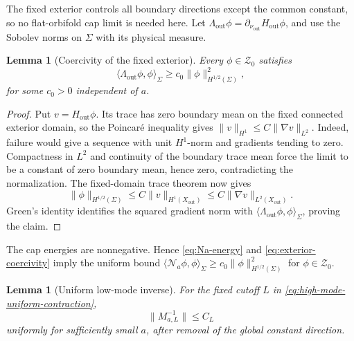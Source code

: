 \documentclass[11pt,a4paper,twoside]{article}
\numberwithin{equation}{section}
\newtheorem{lemma}[theorem]{Lemma}
\theoremstyle{definition}
\theoremstyle{remark}
\begin{document}
The fixed exterior controls all boundary directions except the
common constant, so no flat-orbifold cap limit is needed here. Let
\(\Lambda_{\mathrm{out}}\phi=
\partial_{\nu_{\mathrm{out}}}H_{\mathrm{out}}\phi\), and use the
Sobolev norms on \(\Sigma\) with its physical measure.
\begin{lemma}[Coercivity of the fixed exterior]
\label{lem:exterior-coercivity}
Every \(\phi\in\mathcal Z_0\) satisfies
\begin{equation}\label{eq:exterior-coercivity}
\langle\Lambda_{\mathrm{out}}\phi,\phi\rangle_\Sigma
\ge c_0\|\phi\|_{H^{1/2}(\Sigma)}^2,
\end{equation}
for some \(c_0>0\) independent of \(a\).
\end{lemma}
\begin{proof}
Put \(v=H_{\mathrm{out}}\phi\). Its trace has zero boundary mean
on the fixed connected exterior domain, so the Poincar\'e inequality
gives \(\|v\|_{H^1}\le C\|\nabla v\|_{L^2}\). Indeed, failure
would give a sequence with unit \(H^1\)-norm and gradients tending
to zero. Compactness in \(L^2\) and continuity of the boundary
trace mean force the limit to be a constant of zero boundary mean,
hence zero, contradicting the normalization. The fixed-domain
trace theorem now gives
\[
\|\phi\|_{H^{1/2}(\Sigma)}
\le C\|v\|_{H^1(X_{\mathrm{out}})}
\le C\|\nabla v\|_{L^2(X_{\mathrm{out}})}.
\]
Green's identity identifies the squared gradient norm with
\(\langle\Lambda_{\mathrm{out}}\phi,\phi\rangle_\Sigma\),
proving the claim.
\end{proof}
The cap energies are nonnegative. Hence \eqref{eq:Na-energy} and
\eqref{eq:exterior-coercivity} imply the uniform bound
\(\langle\mathcal N_a\phi,\phi\rangle_\Sigma
\ge c_0\|\phi\|_{H^{1/2}(\Sigma)}^2\) for
\(\phi\in\mathcal Z_0\).
\begin{lemma}[Uniform low-mode inverse]
\label{lem:low-mode-uniform-final}
For the fixed cutoff \(L\) in
\eqref{eq:high-mode-uniform-contraction},
\begin{equation}\label{eq:M-uniform}
\|M_{a,L}^{-1}\|\le C_L
\end{equation}
uniformly for sufficiently small \(a\), after removal of the global
constant direction.
\end{lemma}
\end{document}

